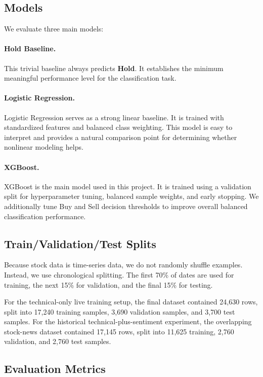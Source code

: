 \documentclass[11pt]{article}
\begin{document}
\subsection{Models}

We evaluate three main models:

\paragraph{Hold Baseline.}
This trivial baseline always predicts \textbf{Hold}. It establishes the minimum meaningful performance level for the classification task.

\paragraph{Logistic Regression.}
Logistic Regression serves as a strong linear baseline. It is trained with standardized features and balanced class weighting. This model is easy to interpret and provides a natural comparison point for determining whether nonlinear modeling helps.

\paragraph{XGBoost.}
XGBoost is the main model used in this project. It is trained using a validation split for hyperparameter tuning, balanced sample weights, and early stopping. We additionally tune Buy and Sell decision thresholds to improve overall balanced classification performance.

\subsection{Train/Validation/Test Splits}

Because stock data is time-series data, we do not randomly shuffle examples. Instead, we use chronological splitting. The first 70\% of dates are used for training, the next 15\% for validation, and the final 15\% for testing.

For the technical-only live training setup, the final dataset contained 24{,}630 rows, split into 17{,}240 training samples, 3{,}690 validation samples, and 3{,}700 test samples. For the historical technical-plus-sentiment experiment, the overlapping stock-news dataset contained 17{,}145 rows, split into 11{,}625 training, 2{,}760 validation, and 2{,}760 test samples.

\subsection{Evaluation Metrics}
\end{document}
